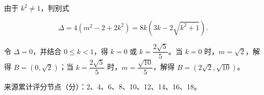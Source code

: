 \begin{answer}
由于 $k^2\ne1$，判别式

\nopagebreak[4]
\[
\Delta=4(m^2-2+2k^2)=8k\left(3k-2\sqrt{k^2+1}\right).
\]

令 $\Delta=0$，并结合 $0\le k<1$，得 $k=0$ 或 $k=\dfrac{2\sqrt5}{5}$。当 $k=0$ 时，$m=\sqrt2$，解得 $B=(0,\sqrt2)$；当 $k=\dfrac{2\sqrt5}{5}$ 时，$m=\dfrac{\sqrt{10}}5$，解得 $B=(2\sqrt2,\sqrt{10})$。

来源累计评分节点（分）：2、4、6、8、10、12、14、16、18。




\end{answer}
